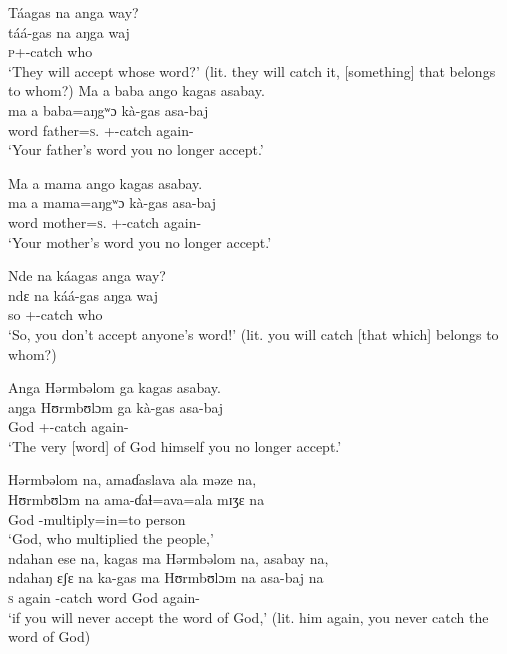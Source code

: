 \ea Táagas  na  anga  way?\\
 \gll táá-gas     na   aŋga   waj\\
 \textsc{p}+{\POT}-catch  {\PSP}  {\POSS}  who\\
 \glt ‘They will accept whose word?’ (lit. they will catch it, [something] that belongs to whom?)
 \z
\clearpage
\ea  Ma   a  baba  ango  kagas  asabay.\\
 \gll ma     a  baba=aŋgʷɔ     kà-gas     asa-baj \\
 word  {\GEN}  father=\textsc{s}.{\POSS}  {\twoS}+{\PFV}-catch  again-{\NEG}  \\
 \glt ‘Your father’s word you no longer accept.’
\z

\ea  Ma   a  mama  ango  kagas  asabay.\\
 \gll ma     a  mama=aŋgʷɔ    kà-gas     asa-baj\\
 word  {\GEN}  mother=\textsc{s}.{\POSS}  {\twoS}+{\PFV}-catch  again-{\NEG}\\
 \glt ‘Your mother’s word you no longer accept.’
 \z

\ea Nde na  káagas  anga  way?\\
 \gll ndɛ  na   káá-gas       aŋga   waj\\
 so  {\PSP}  {\twoS}+{\POT}-catch    {\POSS}  who\\
 \glt ‘So, you don’t accept anyone’s word!’ (lit. you will catch [that which] belongs to whom?)
 \z

\ea Anga  Hərmbəlom  ga  kagas  asabay. \\
 \gll aŋga   Hʊrmbʊlɔm   ga     kà-gas     asa-baj\\
 {\POSS}  God    {\ADJ}    {\twoS}+{\PFV}-catch  again-{\NEG}\\
 \glt ‘The very [word] of God himself you no longer accept.’
 \z

\ea Hərmbəlom  na,  amaɗaslava  ala  məze   na,\\
 \gll Hʊrmbʊlɔm  na  ama-ɗaɬ=ava=ala  mɪʒɛ  na\\
 God    {\PSP}    {\DEP}-multiply=in=to   person   {\PSP}     \\
 \glt ‘God, who multiplied the people,’\\
 
 \medskip
  ndahan  ese  na,  kagas  ma  Hərmbəlom  na,  asabay  na,  \\
 \gll ndahaŋ  ɛʃɛ  na  ka-gas      ma  Hʊrmbʊlɔm  na       asa-baj         na\\
 \textsc{s}     again    {\PSP}    {\twoS}-catch    word     God          {\PSP}  again-{\NEG}  {\PSP} \\
 \glt ‘if you will never accept the word of God,’ (lit. him again, you never catch the word of God)\\
 
